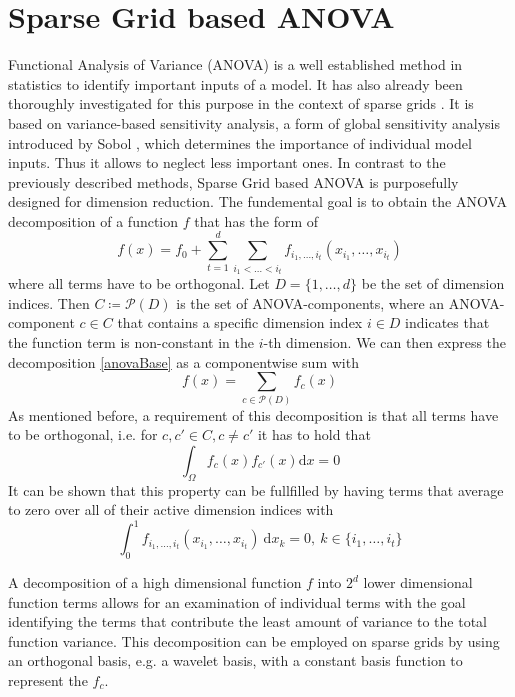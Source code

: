 \documentclass[
  a4paper,  %
  twoside,  %
  bibliography=totoc,
  headsepline,
  cleardoublepage=empty,
  parskip=half,
  draft=false
]{scrbook}
\begin{document}
\section{Sparse Grid based ANOVA}

Functional Analysis of Variance (ANOVA)  is a well established method in statistics to identify important inputs of a model.
It has also already been thoroughly investigated for this purpose in the context of sparse grids \cite{F10}.
It is based on variance-based sensitivity analysis, a form of global sensitivity analysis introduced by Sobol \cite{S01}, which determines the importance of individual model inputs.
Thus it allows to neglect less important ones.
In contrast to the previously described methods, Sparse Grid based ANOVA is purposefully designed for dimension reduction.
The fundemental goal is to obtain the ANOVA decomposition of a function $f$ that has the form of
\begin{equation}
f(x)=f_0 + \sum_{t=1}^d \sum_{i_1 < \dots < i_t} f_{i_1,\dots,i_t}(x_{i_1},\dots,x_{i_t})
\label{anovaBase}
\end{equation}
where all terms have to be orthogonal.
Let $D=\{1,\dots,d\}$ be the set of dimension indices.
Then $C \coloneqq \mathcal{P}(D)$ is the set of ANOVA-components, where an ANOVA-component $c \in C$ that contains a specific dimension index $i \in D$ indicates that the function term is non-constant in the $i$-th dimension.
We can then express the decomposition \eqref{anovaBase} as a componentwise sum with
\begin{equation}
f(x)=\sum_{c \in \mathcal{P}(D)} f_{c}(x)
\label{anovaComp}
\end{equation}
As mentioned before, a requirement of this decomposition is that all terms have to be orthogonal, i.e. for $c,c' \in C, c \neq c'$ it has to hold that
\begin{equation}
\int_{\Omega} f_c(x) f_{c'}(x) \text{d}x = 0
\end{equation}
It can be shown that this property can be fullfilled by having terms that average to zero over all of their active dimension indices with
\begin{equation}
\int_0^1 f_{i_1,\dots,i_t}(x_{i_1},\dots,x_{i_t}) ~ \text{d}x_k = 0, ~ k \in \{i_1, \dots, i_t\}
\end{equation}



A decomposition of a high dimensional function $f$ into $2^d$ lower dimensional function terms allows for an examination of individual terms with the goal identifying the terms that contribute the least amount of variance to the total function variance.
This decomposition can be employed on sparse grids by using an orthogonal basis, e.g. a wavelet basis, with a constant basis function to represent the $f_c$.
\end{document}
